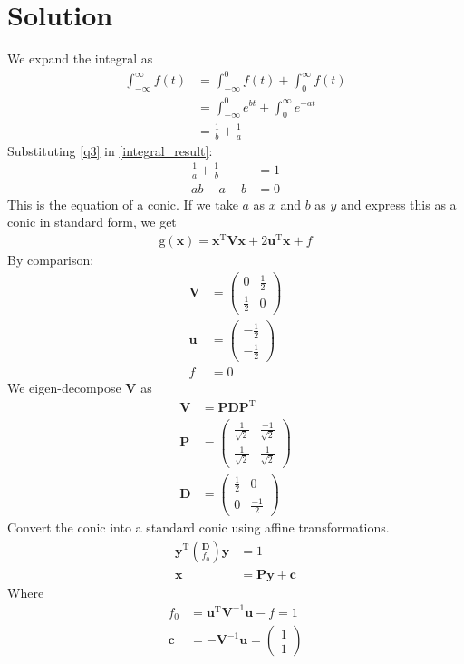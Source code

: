 \documentclass[conference]{IEEEtran}
\theoremstyle{remark}
\providecommand{\brak}[1]{\ensuremath{\left(#1\right)}}
\newcommand{\myvec}[1]{\ensuremath{\begin{pmatrix}#1\end{pmatrix}}}
\renewcommand{\vec}[1]{\boldsymbol{\mathbf{#1}}}
\begin{document}
	\section{Solution}
	We expand the integral as 
	\begin{align}
		\int_{-\infty}^{\infty} f(t) &= \int_{-\infty}^{0} f(t) + \int_{0}^{\infty} f(t)\\
		&= \int_{-\infty}^{0} e^{bt} + \int_{0}^{\infty} e^{-at}\\
		&= \frac{1}{b} + \frac{1}{a} \label{integral_result}
	\end{align}
	Substituting \eqref{q3} in \eqref{integral_result}:
	\begin{align}
		\frac{1}{a} + \frac{1}{b} &= 1\\
		ab - a - b &= 0 \label{conic_ab}
	\end{align}
	This is the equation of a conic. If we take $a$ as $x$ and $b$ as $y$ and express this as a conic in standard form, we get
	\begin{align}
		\text{g}(\vec{x}) = \vec{x}^\text{T}\vec{Vx} + 2\vec{u}^\text{T}\vec{x} + f \label{actual_conic}
	\end{align}
	By comparison:
	\begin{align}
		\vec{V} &= \myvec{0 & \frac{1}{2} \\ \frac{1}{2} & 0}\\
		\vec{u} &= \myvec{-\frac{1}{2} \\ -\frac{1}{2}}\\
		f &= 0
	\end{align}
	We eigen-decompose $\vec{V}$ as 
	\begin{align}
		\vec{V} &= \vec{PDP}^\text{T}\\
		\vec{P} &= \myvec{\frac{1}{\sqrt{2}} & \frac{-1}{\sqrt{2}} \\ \frac{1}{\sqrt{2}} & \frac{1}{\sqrt{2}}}\\
		\vec{D} &= \myvec{\frac{1}{2} & 0 \\ 0 & \frac{-1}{2}}
	\end{align}
	Convert the conic into a standard conic using affine transformations.
	\begin{align}
		\vec{y}^\text{T}\brak{\frac{\vec{D}}{f_0}}\vec{y} &= 1\\
		\vec{x} &= \vec{Py} + \vec{c} \label{t1}
	\end{align}
	Where 
	\begin{align}
		f_0 &= \vec{u}^\text{T}\vec{V}^{-1}\vec{u} - f = 1\\
		\vec{c} &= -\vec{V}^{-1}\vec{u} = \myvec{1 \\ 1}
	\end{align}
\end{document}
